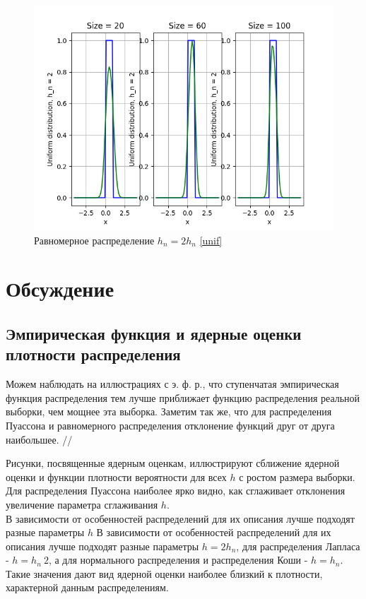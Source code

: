 \documentclass[a4paper]{article}
\begin{document}
        \begin{figure}[H]
            \centering
            \includegraphics[scale = 0.4]{Uniform distribution, h_n = 2.png}
            \caption{Равномерное распределение $h_n = 2 h_n$ \eqref{unif}}
            \label{fig:cauchy}
        \end{figure}

    
\section{Обсуждение}
    \subsection{Эмпирическая функция и ядерные оценки плотности распределения}
        Можем наблюдать на иллюстрациях с э. ф. р., что ступенчатая эмпирическая функция распределения тем лучше приближает функцию распределения реальной выборки, чем мощнее эта выборка. Заметим так же, что для распределения Пуассона и равномерного распределения отклонение функций друг от друга наибольшее. //

        Рисунки, посвященные ядерным оценкам, иллюстрируют сближение ядерной оценки и функции плотности вероятности для всех $h$  с ростом размера выборки. Для распределения Пуассона наиболее ярко видно, как сглаживает отклонения увеличение параметра сглаживания $h$. \\
        
        В зависимости от особенностей распределений для их описания лучше подходят разные параметры $h$ В зависимости от особенностей распределений для их описания лучше подходят разные параметры $h = 2 h_n$, для распределения Лапласа - $h = h_n \ 2$, а для нормального распределения и распределения Коши - $h = h_n$. Такие значения дают вид ядерной оценки наиболее близкий к плотности, характерной данным распределениям. \\
        
\end{document}
